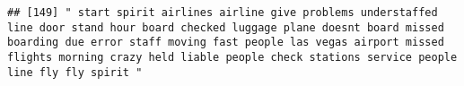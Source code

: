 \documentclass[
]{article}
\begin{document}
\begin{verbatim}
## [149] " start spirit airlines airline give problems understaffed line door stand hour board checked luggage plane doesnt board missed boarding due error staff moving fast people las vegas airport missed flights morning crazy held liable people check stations service people line fly fly spirit "                                                                                                                                                                                                                                                                                                                                                                                                                                                                                                                                                                                                                                                                                                                                                                                                                                                                                                                                                                                                                                                                                                                                                                                                                                                                                                                                                                                                                                                                                               

\end{verbatim}
\end{document}
